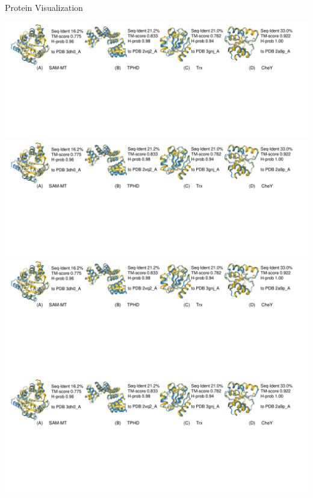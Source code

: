 \documentclass[dvipsnames]{beamer}
\begin{document}
\begin{frame}{Protein Visualization}
	\begin{center}
		\includegraphics[trim={0 0 90em 0},clip,scale=0.4]{images/protein_visualization.pdf}
		\includegraphics[trim={31.5em 0 57.4em 0},clip,scale=0.4]{images/protein_visualization.pdf}
		\includegraphics[trim={64em 0 30em 0},clip,scale=0.4]{images/protein_visualization.pdf}
		\includegraphics[trim={92em 0 0 0},clip,scale=0.4]{images/protein_visualization.pdf}
	\end{center}
\end{frame}
\end{document}
